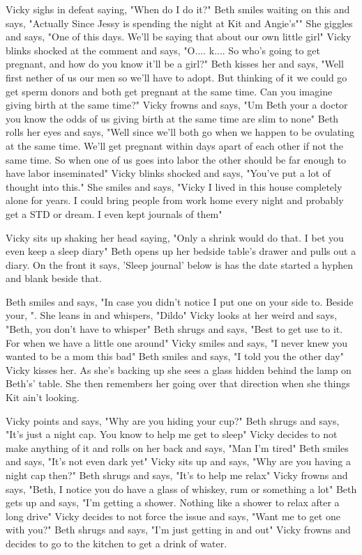 \documentclass{article}[12px]
\begin{document}
    Vicky sighs in defeat saying, "When do I do it?" Beth smiles waiting on this and says, "Actually Since Jessy is spending the night at Kit and Angie's"" She giggles and says, "One of this days. We'll be saying that about our own little girl" Vicky blinks shocked at the comment and says, "O.... k.... So who's going to get pregnant, and how do you know it'll be a girl?" Beth kisses her and says, "Well first nether of us our men so we'll have to adopt. But thinking of it we could go get sperm donors and both get pregnant at the same time. Can you imagine giving birth at the same time?" Vicky frowns and says, "Um Beth your a doctor you know the odds of us giving birth at the same time are slim to none" Beth rolls her eyes and says, "Well since we'll both go when we happen to be ovulating at the same time. We'll get pregnant within days apart of each other if not the same time. So when one of us goes into labor the other should be far enough to have labor inseminated" Vicky blinks shocked and says, "You've put a lot of thought into this." She smiles and says, "Vicky I lived in this house completely alone for years. I could bring people from work home every night and probably get a STD or dream. I even kept journals of them" 
    
    Vicky sits up shaking her head saying, "Only a shrink would do that. I bet you even keep a sleep diary" Beth opens up her bedside table's drawer and pulls out a diary. On the front it says, 'Sleep journal' below is has the date started a hyphen and blank beside that.

    Beth smiles and says, "In case you didn't notice I put one on your side to. Beside your, ". She leans in and whispers, "Dildo" Vicky looks at her weird and says, "Beth, you don't have to whisper" Beth shrugs and says, "Best to get use to it. For when we have a little one around" Vicky smiles and says, "I never knew you wanted to be a mom this bad" Beth smiles and says, "I told you the other day" Vicky kisses her. As she's backing up she sees a glass hidden behind the lamp on Beth's' table. She then remembers her going over that direction when she things Kit ain't looking.

    Vicky points and says, "Why are you hiding your cup?" Beth shrugs and says, "It's just a night cap. You know to help me get to sleep" Vicky decides to not make anything of it and rolls on her back and says, "Man I'm tired" Beth smiles and says, "It's not even dark yet" Vicky sits up and says, "Why are  you having a night cap then?" Beth shrugs and says, "It's to help me relax" Vicky frowns and says, "Beth, I notice you do have a glass of whiskey, rum or something a lot" Beth gets up and says, "I'm getting a shower. Nothing like a shower to relax after a long drive" Vicky decides to not force the issue and says, "Want me to get one with you?" Beth shrugs and says, "I'm just getting in and out" Vicky frowns and decides to go to the kitchen to get a drink of water. 
\end{document}
